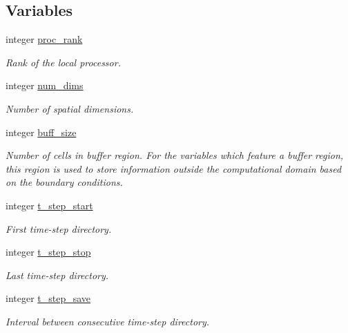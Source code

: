 \subsection*{Variables}
\begin{DoxyCompactItemize}
\item 
integer \hyperlink{namespacem__global__parameters_a383c6ff025d4ea09ddd4e2356042d86b}{proc\+\_\+rank}
\begin{DoxyCompactList}\small\item\em Rank of the local processor. \end{DoxyCompactList}\item 
integer \hyperlink{namespacem__global__parameters_a76e251296a28212df87bf9f653ff9a3b}{num\+\_\+dims}
\begin{DoxyCompactList}\small\item\em Number of spatial dimensions. \end{DoxyCompactList}\item 
integer \hyperlink{namespacem__global__parameters_a6e342ae3eb66f89e0eeb94e11aa42d92}{buff\+\_\+size}
\begin{DoxyCompactList}\small\item\em Number of cells in buffer region. For the variables which feature a buffer region, this region is used to store information outside the computational domain based on the boundary conditions. \end{DoxyCompactList}\item 
integer \hyperlink{namespacem__global__parameters_ace0c8a67825d0dccd2e23b5d0f9985c0}{t\+\_\+step\+\_\+start}
\begin{DoxyCompactList}\small\item\em First time-\/step directory. \end{DoxyCompactList}\item 
integer \hyperlink{namespacem__global__parameters_aff1140575af25247060f3e7f31a8a10f}{t\+\_\+step\+\_\+stop}
\begin{DoxyCompactList}\small\item\em Last time-\/step directory. \end{DoxyCompactList}\item 
integer \hyperlink{namespacem__global__parameters_a98b51eda2c46660b439c0a8375385165}{t\+\_\+step\+\_\+save}
\begin{DoxyCompactList}\small\item\em Interval between consecutive time-\/step directory. \end{DoxyCompactList}\item 

\end{DoxyCompactItemize}
